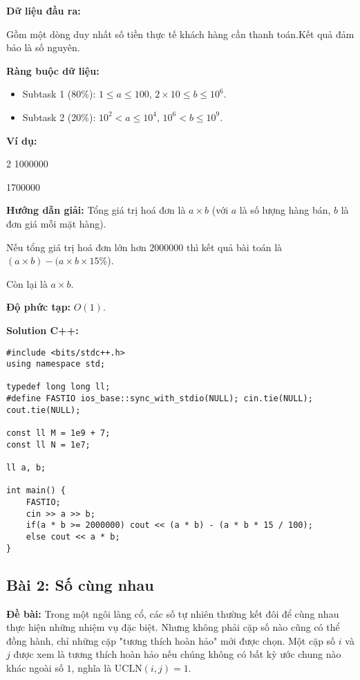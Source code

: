 \documentclass[12pt]{scrartcl}  %
\begin{document}
\textbf{Dữ liệu đầu ra:}

Gồm một dòng duy nhất số tiền thực tế khách hàng cần thanh toán.Kết quả đảm bảo là số nguyên.

\textbf{Ràng buộc dữ liệu:}
\begin{itemize}
    \item Subtask 1 (80\%): $1 \leq a \leq 100$, $2 \times 10 \leq b \leq 10^6$.
    \item Subtask 2 (20\%): $10^2 < a \leq 10^4$, $10^6 < b \leq 10^9$.
\end{itemize}

\textbf{Ví dụ:}
\begin{tcolorbox}[colback=gray!5!white, colframe=blue!50!black, title=Input]
2 1000000
\end{tcolorbox}
\begin{tcolorbox}[colback=gray!5!white, colframe=green!50!black, title=Output]
1700000
\end{tcolorbox}
\textbf{Hướng dẫn giải:} Tổng giá trị hoá đơn là $a \times b$ (với $a$ là số lượng hàng bán,
$b$ là đơn giá mỗi mặt hàng).

Nếu tổng giá trị hoá đơn lớn hơn $2000000$ thì kết quả bài toán là $(a \times b) - (a \times b \times 15$\%).

Còn lại là $a \times b$.

\textbf{Độ phức tạp:} $O(1)$.

\textbf{Solution C++:}
\begin{lstlisting}
#include <bits/stdc++.h>
using namespace std;

typedef long long ll;
#define FASTIO ios_base::sync_with_stdio(NULL); cin.tie(NULL); cout.tie(NULL);

const ll M = 1e9 + 7;
const ll N = 1e7;

ll a, b;

int main() {
    FASTIO;
    cin >> a >> b;
    if(a * b >= 2000000) cout << (a * b) - (a * b * 15 / 100);
    else cout << a * b;
}
\end{lstlisting}

\subsection{Bài 2: Số cùng nhau}
\textbf{Đề bài:}
Trong một ngôi làng cổ, các số tự nhiên thường kết đôi để cùng nhau thực hiện những nhiệm vụ đặc biệt. Nhưng không phải cặp số nào cũng có thể đồng hành, chỉ những cặp "tương thích hoàn hảo" mới được chọn. Một cặp số $i$ và $j$ được xem là tương thích hoàn hảo nếu chúng không có bất kỳ ước chung nào khác ngoài số $1$, nghĩa là $\mathrm{UCLN}(i, j) = 1$.
\end{document}
